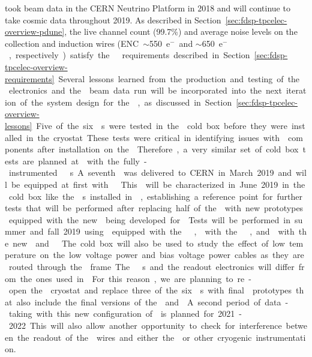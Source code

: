  took beam data in the CERN Neutrino Platform in 2018 and will continue
to take cosmic data throughout 2019. As described in Section~\ref{sec:fdsp-tpcelec-overview-pdune},
the live channel count (99.7\%) and average noise levels on the collection and induction wires 
(ENC~$\sim$\SI{550}{e$^-$} and $\sim$\SI{650}{e$^-$}, respectively) satisfy the  requirements described 
in Section~\ref{sec:fdsp-tpcelec-overview-requirements}. Several lessons learned from the production 
and testing of the  electronics and the  beam data run will be incorporated into the 
next iteration of the system design for the , as discussed in 
Section~\ref{sec:fdsp-tpcelec-overview-lessons}.

Five of the six s were tested in the  cold box
before they were installed in the cryostat. These tests were critical
in identifying issues with  components after installation
on the . Therefore, a very similar set of cold box tests are planned at  
with the fully-instrumented  s. A seventh  was delivered
to CERN in March 2019 and will be equipped at first with  . This
 will be characterized in June 2019 in the cold box like the s installed
in , establishing a reference point for further tests that will be
performed after replacing half of the  with new prototypes equipped with the
new  being developed for . Tests will be performed in summer and
fall 2019 using  equipped with the  , 
with the  , and  with the new  and
 . The cold box will also be used to study the effect of
low temperature on the low voltage power and bias voltage power cables as they are 
routed through the  frame.

The  s and the readout electronics will differ from the ones used 
in . For this reason, we are planning to re-open the  cryostat 
and replace three of the six s with final  prototypes that also include 
the final versions of the  and . A second period of data-taking 
with this new configuration of  is planned for 2021-2022. This will also 
allow another opportunity to check for interference between the readout of the  
wires and either the  or other cryogenic instrumentation. 

